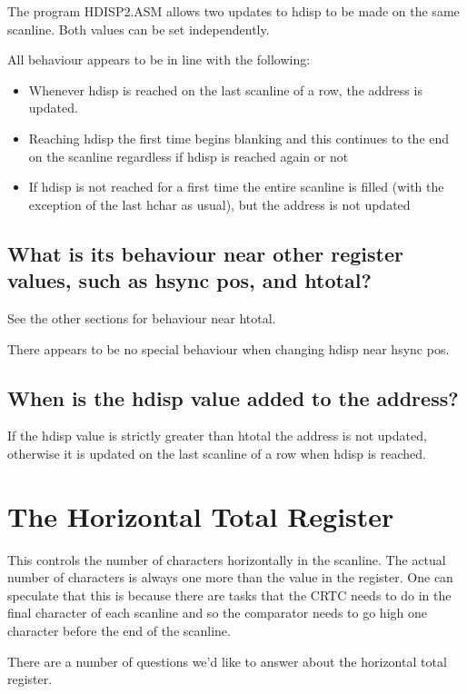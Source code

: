 \documentclass[a4paper,10pt]{amsart}
\begin{document}
The program HDISP2.ASM allows two updates to hdisp to be made on the same
scanline. Both values can be set independently.

All behaviour appears to be in line with the following:

\begin{itemize}
\item Whenever hdisp is reached on the last scanline of a row, the address is
      updated.
\item Reaching hdisp the first time begins blanking and this continues to the
      end on the scanline regardless if hdisp is reached again or not
\item If hdisp is not reached for a first time the entire scanline is filled
      (with the exception of the last hchar as usual), but the address is not
      updated
\end{itemize}

\subsection{What is its behaviour near other register values, such as hsync pos,
and htotal?}

See the other sections for behaviour near htotal.

There appears to be no special behaviour when changing hdisp near hsync pos.

\subsection{When is the hdisp value added to the address?}

If the hdisp value is strictly greater than htotal the address is not updated,
otherwise it is updated on the last scanline of a row when hdisp is reached.

\section{The Horizontal Total Register}

This controls the number of characters horizontally in the scanline. The actual
number of characters is always one more than the value in the register. One
can speculate that this is because there are tasks that the CRTC needs to do in
the final character of each scanline and so the comparator needs to go high one
character before the end of the scanline.

There are a number of questions we'd like to answer about the horizontal total
register.
\end{document}
